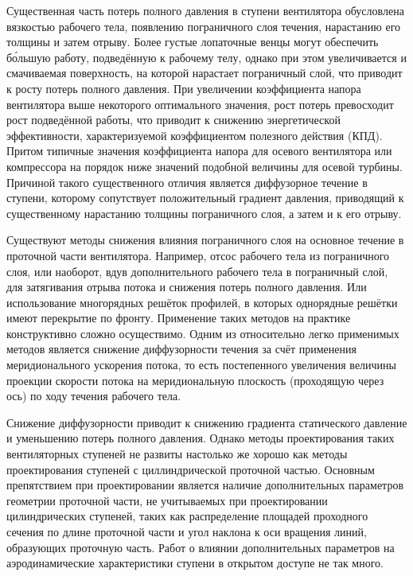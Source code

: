 Существенная часть потерь полного давления в ступени вентилятора обусловлена вязкостью рабочего тела, появлению пограничного слоя течения, нарастанию его толщины и затем отрыву. Более густые лопаточные венцы могут обеспечить б\'ольшую работу, подведённую к рабочему телу, однако при этом увеличивается и смачиваемая поверхность, на которой нарастает пограничный слой, что приводит к росту потерь полного давления.  
При увеличении коэффициента напора вентилятора выше некоторого оптимального значения, рост потерь превосходит рост подведённой работы, что приводит к снижению энергетической эффективности, характеризуемой коэффициентом полезного действия (КПД). Притом типичные значения коэффициента напора для осевого вентилятора или компрессора на порядок ниже значений подобной величины для осевой турбины. Причиной такого существенного отличия является диффузорное течение в ступени, которому сопутствует положительный градиент давления, приводящий к существенному нарастанию толщины пограничного слоя, а затем и к его отрыву.

Существуют методы снижения влияния пограничного слоя на основное течение в проточной части вентилятора. Например, отсос рабочего тела из пограничного слоя, или наоборот, вдув дополнительного рабочего тела в пограничный слой, для затягивания отрыва потока и снижения потерь полного давления. Или использование многорядных решёток профилей, в которых однорядные решётки имеют перекрытие по фронту. Применение таких методов на практике конструктивно сложно осуществимо. Одним из относительно легко применимых методов является снижение диффузорности течения за счёт применения меридионального ускорения потока, то есть постепенного увеличения величины проекции скорости потока на меридиональную плоскость (проходящую через ось) по ходу течения рабочего тела.  

Снижение диффузорности приводит к снижению градиента статического давление и уменьшению потерь полного давления. Однако методы проектирования таких вентиляторных ступеней не развиты настолько же хорошо как методы проектирования ступеней с циллиндрической проточной частью. Основным препятствием при проектировании является наличие дополнительных параметров геометрии проточной части, не учитываемых при проектировании цилиндрических ступеней, таких как распределение площадей проходного сечения по длине проточной части и угол наклона к оси вращения линий, образующих проточную часть. Работ о влиянии дополнительных параметров на аэродинамические характеристики ступени в открытом доступе не так много. 

